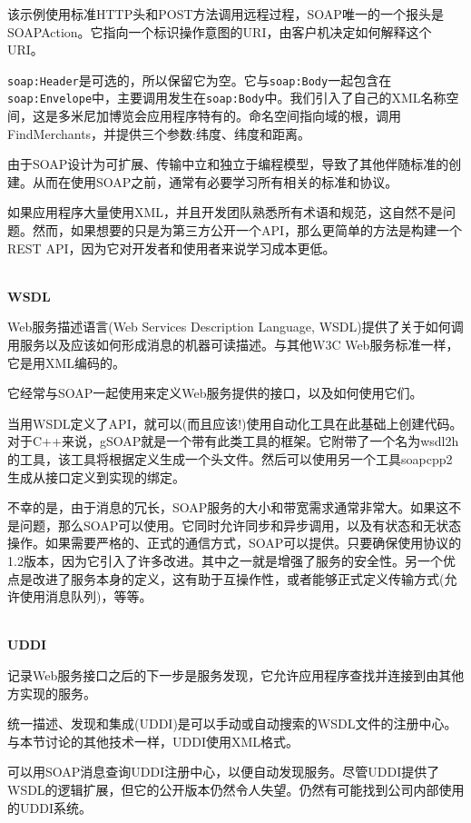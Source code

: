 该示例使用标准HTTP头和POST方法调用远程过程，SOAP唯一的一个报头是SOAPAction。它指向一个标识操作意图的URI，由客户机决定如何解释这个URI。

\texttt{soap:Header}是可选的，所以保留它为空。它与\texttt{soap:Body}一起包含在\texttt{soap:Envelope}中，主要调用发生在\texttt{soap:Body}中。我们引入了自己的XML名称空间，这是多米尼加博览会应用程序特有的。命名空间指向域的根，调用FindMerchants，并提供三个参数:纬度、纬度和距离。

由于SOAP设计为可扩展、传输中立和独立于编程模型，导致了其他伴随标准的创建。从而在使用SOAP之前，通常有必要学习所有相关的标准和协议。

如果应用程序大量使用XML，并且开发团队熟悉所有术语和规范，这自然不是问题。然而，如果想要的只是为第三方公开一个API，那么更简单的方法是构建一个REST API，因为它对开发者和使用者来说学习成本更低。

\hspace*{\fill} \\ %
\noindent
\textbf{WSDL}

Web服务描述语言(Web Services Description Language, WSDL)提供了关于如何调用服务以及应该如何形成消息的机器可读描述。与其他W3C Web服务标准一样，它是用XML编码的。

它经常与SOAP一起使用来定义Web服务提供的接口，以及如何使用它们。

当用WSDL定义了API，就可以(而且应该!)使用自动化工具在此基础上创建代码。对于C++来说，gSOAP就是一个带有此类工具的框架。它附带了一个名为wsdl2h的工具，该工具将根据定义生成一个头文件。然后可以使用另一个工具soapcpp2生成从接口定义到实现的绑定。

不幸的是，由于消息的冗长，SOAP服务的大小和带宽需求通常非常大。如果这不是问题，那么SOAP可以使用。它同时允许同步和异步调用，以及有状态和无状态操作。如果需要严格的、正式的通信方式，SOAP可以提供。只要确保使用协议的1.2版本，因为它引入了许多改进。其中之一就是增强了服务的安全性。另一个优点是改进了服务本身的定义，这有助于互操作性，或者能够正式定义传输方式(允许使用消息队列)，等等。

\hspace*{\fill} \\ %
\noindent
\textbf{UDDI}

记录Web服务接口之后的下一步是服务发现，它允许应用程序查找并连接到由其他方实现的服务。

统一描述、发现和集成(UDDI)是可以手动或自动搜索的WSDL文件的注册中心。与本节讨论的其他技术一样，UDDI使用XML格式。

可以用SOAP消息查询UDDI注册中心，以便自动发现服务。尽管UDDI提供了WSDL的逻辑扩展，但它的公开版本仍然令人失望。仍然有可能找到公司内部使用的UDDI系统。


